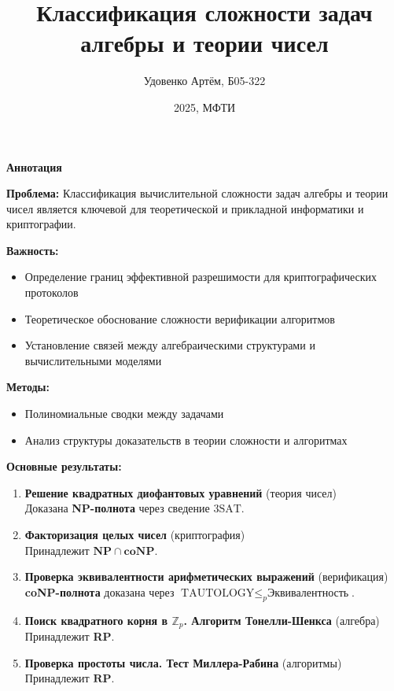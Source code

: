 \documentclass[a4paper,12pt]{article}
\title{Классификация сложности задач алгебры и теории чисел}
\author{Удовенко Артём, Б05-322}
\date{2025, МФТИ}
\begin{document}
\maketitle
\begin{center}
\textbf{Аннотация}
\end{center}

\noindent \textbf{Проблема:} Классификация вычислительной сложности задач алгебры и теории чисел является ключевой для теоретической и прикладной информатики и криптографии.

\vspace{0.5em}

\noindent \textbf{Важность:}
\begin{itemize}[leftmargin=*,noitemsep]
  \item Определение границ эффективной разрешимости для криптографических протоколов
  \item Теоретическое обоснование сложности верификации алгоритмов
  \item Установление связей между алгебраическими структурами и вычислительными моделями
\end{itemize}

\noindent \textbf{Методы:}
\begin{itemize}[leftmargin=*,noitemsep]
  \item Полиномиальные сводки между задачами
  \item Анализ структуры доказательств в теории сложности и алгоритмах
\end{itemize}

\noindent \textbf{Основные результаты:}
\begin{enumerate}[leftmargin=*,noitemsep]
  \item \textbf{Решение квадратных диофантовых уравнений} (теория чисел) \\
  Доказана \textbf{NP-полнота} через сведение \(3\text{SAT}\).

  \item \textbf{Факторизация целых чисел} (криптография) \\
  Принадлежит \(\mathbf{NP \cap coNP}\).

  \item \textbf{Проверка эквивалентности арифметических выражений} (верификация) \\
  \textbf{coNP-полнота} доказана через \(\text{TAUTOLOGY} \leq_p \text{Эквивалентность}\).

  \item \textbf{Поиск квадратного корня в \(\mathbb{Z}_p\). Алгоритм Тонелли-Шенкса} (алгебра) \\
  Принадлежит \textbf{RP}.

  \item \textbf{Проверка простоты числа. Тест Миллера-Рабина} (алгоритмы) \\
  Принадлежит \(\mathbf{RP}\).
\end{enumerate}
\end{document}
